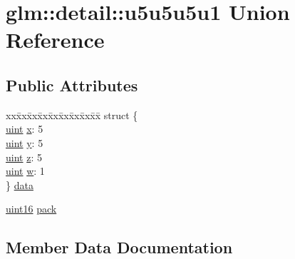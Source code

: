 \hypertarget{unionglm_1_1detail_1_1u5u5u5u1}{}\section{glm\+:\+:detail\+:\+:u5u5u5u1 Union Reference}
\label{unionglm_1_1detail_1_1u5u5u5u1}
\subsection*{Public Attributes}
\begin{DoxyCompactItemize}
\item 
\begin{tabbing}
xx\=xx\=xx\=xx\=xx\=xx\=xx\=xx\=xx\=\kill
struct \{\\
\>\hyperlink{group__core__precision_ga4fd29415871152bfb5abd588334147c8}{uint} \hyperlink{unionglm_1_1detail_1_1u5u5u5u1_a2d802a46e48a88f87754882be376b34f}{x}: 5\\
\>\hyperlink{group__core__precision_ga4fd29415871152bfb5abd588334147c8}{uint} \hyperlink{unionglm_1_1detail_1_1u5u5u5u1_a8dff950581d19ad8a5137dbfffc63a64}{y}: 5\\
\>\hyperlink{group__core__precision_ga4fd29415871152bfb5abd588334147c8}{uint} \hyperlink{unionglm_1_1detail_1_1u5u5u5u1_a110d067e1f37f6137c2806102c4508f6}{z}: 5\\
\>\hyperlink{group__core__precision_ga4fd29415871152bfb5abd588334147c8}{uint} \hyperlink{unionglm_1_1detail_1_1u5u5u5u1_a1dc286ba6a4f8b0c04db3997af661cd5}{w}: 1\\
\} \hyperlink{unionglm_1_1detail_1_1u5u5u5u1_a22d17eb5ead264ae4d99e3beff2ed1a9}{data}\\

\end{tabbing}\item 
\hyperlink{namespaceglm_1_1detail_a47b2a7d006d187338e8031a352d1ce56}{uint16} \hyperlink{unionglm_1_1detail_1_1u5u5u5u1_acbc99680c58046aeb5c4f2b284680a8b}{pack}
\end{DoxyCompactItemize}


\subsection{Member Data Documentation}
\mbox{\label{unionglm_1_1detail_1_1u5u5u5u1_a22d17eb5ead264ae4d99e3beff2ed1a9}} 
